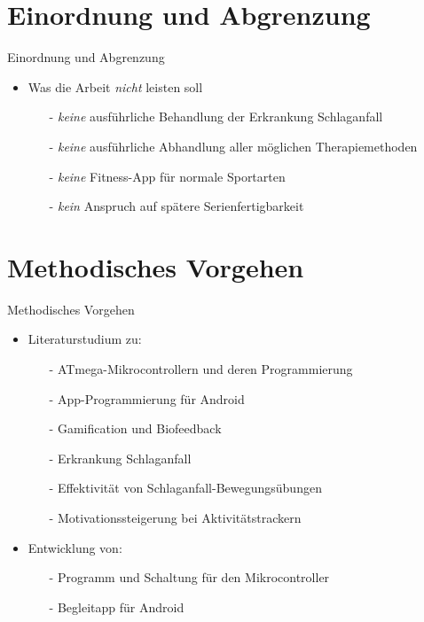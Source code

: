 \documentclass[hyphens]{beamer}
\begin{document}
 \section{Einordnung und Abgrenzung}
 \begin{frame}{Einordnung und Abgrenzung}
 \begin{itemize}[<+->]
 \item Was die Arbeit \emph{nicht} leisten soll
 		\begin{itemize}
 		\item[-] \emph{keine} ausführliche Behandlung der Erkrankung Schlaganfall
 		\item[-] \emph{keine} ausführliche Abhandlung aller möglichen Therapiemethoden
 		\item[-] \emph{keine} Fitness-App für normale Sportarten
 		\item[-] \emph{kein} Anspruch auf spätere Serienfertigbarkeit
 		\end{itemize}
 \end{itemize}

 \end{frame}
 
 \section{Methodisches Vorgehen}
 \begin{frame}{Methodisches Vorgehen}
 \begin{itemize}[<+->]
 \item Literaturstudium zu:
 		\begin{itemize}
 		\item[-] ATmega-Mikrocontrollern und deren Programmierung
 		\item[-] App-Programmierung für Android
 		\item[-] Gamification und Biofeedback
 		\item[-] Erkrankung Schlaganfall
 		\item[-] Effektivität von Schlaganfall-Bewegungsübungen
 		\item[-] Motivationssteigerung bei Aktivitätstrackern
 		\end{itemize}
 \item Entwicklung von:
 		\begin{itemize}
 		\item[-] Programm und Schaltung für den Mikrocontroller
 		\item[-] Begleitapp für Android
 		\end{itemize}
 \end{itemize}
 \end{frame}
 
\end{document}
